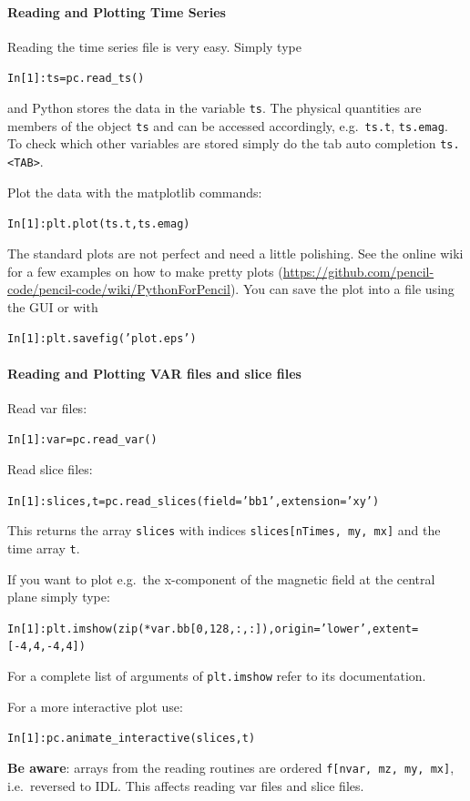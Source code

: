 \documentclass[\mydriver,12pt,twoside,notitlepage,a4paper]{article}
\begin{document}
\paragraph{Reading and Plotting Time Series}
Reading the time series file is very easy.
Simply type
\begin{alltt}
In [1]: ts = pc.read_ts()
\end{alltt}
and Python stores the data in the variable \texttt{ts}.
The physical quantities are members of the object \texttt{ts} and can be accessed
accordingly, e.g.\ \texttt{ts.t}, \texttt{ts.emag}.
To check which other variables are stored simply do the tab auto completion \texttt{ts. <TAB>}.

Plot the data with the matplotlib commands:
\begin{alltt}
In [1]: plt.plot(ts.t, ts.emag)
\end{alltt}
The standard plots are not perfect and need a little polishing.
See the online wiki for a few examples on how to make pretty plots
(\url{https://github.com/pencil-code/pencil-code/wiki/PythonForPencil}).
You can save the plot into a file using the GUI or with
\begin{alltt}
In [1]: plt.savefig('plot.eps')
\end{alltt}

\paragraph{Reading and Plotting VAR files and slice files}
Read var files:
\begin{alltt}
In [1]: var = pc.read_var()
\end{alltt}
Read slice files:
\begin{alltt}
In [1]: slices, t = pc.read_slices(field='bb1', extension='xy')
\end{alltt}
This returns the array \texttt{slices} with indices \texttt{slices[nTimes, my, mx]}
and the time array \texttt{t}.

If you want to plot e.g.\ the x-component of the magnetic field at the central plane simply type:
\begin{alltt}
In [1]: plt.imshow(zip(*var.bb[0, 128, :, :]), origin='lower', extent=[-4, 4, -4, 4])
\end{alltt}
For a complete list of arguments of \texttt{plt.imshow} refer to its documentation.

For a more interactive plot use:
\begin{alltt}
In [1]: pc.animate_interactive(slices, t)
\end{alltt}
\textbf{Be aware}: arrays from the reading routines are ordered
\texttt{f[nvar, mz, my, mx]}, i.e.\ reversed to IDL.
This affects reading var files and slice files.
\end{document}
